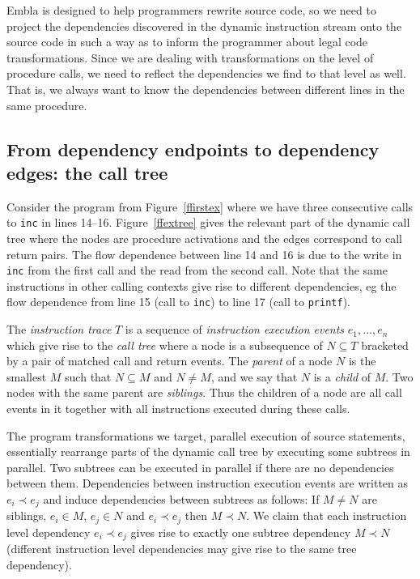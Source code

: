 \documentclass{acm_proc_article-sp}
\begin{document}

Embla is designed to help programmers 
rewrite source code, so we need to project 
the dependencies discovered in the dynamic instruction stream onto the 
source code in such a way as to inform the programmer about legal code 
transformations. Since we are dealing with transformations on the level of
procedure calls, we need to reflect the dependencies we find to that level 
as well. That is, we always want to know the dependencies between different 
lines in the same procedure.

\subsection{From dependency endpoints to dependency edges: the call tree}

Consider the program from Figure~\ref{ffirstex} where we have three consecutive
calls to {\tt inc} in lines 14--16. Figure~\ref{ffextree} gives the relevant 
part of the dynamic call tree where the nodes are procedure activations and the 
edges correspond to call
return pairs. The flow dependence between line 14 and 16 is due 
to the write in {\tt inc} from the first call and the read from the second call.
Note that the same instructions in other calling contexts give rise to 
different dependencies, eg the flow dependence from line 15 (call to {\tt inc})
to line 17 (call to {\tt printf}).

The {\em instruction trace} $T$ is a sequence of {\em instruction execution 
events} $e_1, \ldots, e_n$ which give rise to the {\em call tree} where a 
node is a subsequence of $N \subseteq T$ bracketed by a pair of matched call 
and return events. The {\em parent} of a node $N$ is the smallest $M$ such
that $N \subseteq M$ and $N \not= M$, and we say that $N$ is a {\em child} 
of $M$. Two nodes with the same parent are {\em siblings}.
Thus the children of a node are all call events in it together 
with all instructions executed during these calls.

The program transformations we target, parallel execution of source statements,
essentially rearrange parts of the dynamic call tree by executing some subtrees 
in parallel. Two subtrees can be executed in parallel
if there are no dependencies between them. 
Dependencies between instruction execution events are written as $e_i \prec e_j$
and induce dependencies between subtrees as follows: If $M \not= N$ are 
siblings, $e_i \in M$, $e_j \in N$ and $e_i \prec e_j$ then $M \prec N$.
We claim that each instruction level dependency $e_i \prec e_j$ gives rise to 
exactly one subtree dependency $M \prec N$ (different instruction level 
dependencies may give rise to the same tree dependency).
\end{document}
